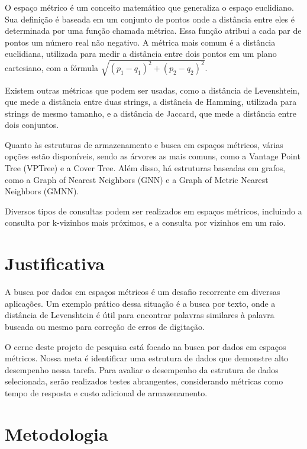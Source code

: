 \documentclass[a4paper,12pt,oneside]{article}
\begin{document}
O espaço métrico é um conceito matemático que generaliza o espaço euclidiano. Sua definição é baseada em um conjunto de pontos onde a distância entre eles é determinada por uma função chamada métrica. Essa função atribui a cada par de pontos um número real não negativo. A métrica mais comum é a distância euclidiana, utilizada para medir a distância entre dois pontos em um plano cartesiano, com a fórmula $\sqrt{(p_1-q_1)^2 + (p_2-q_2)^2}$.

Existem outras métricas que podem ser usadas, como a distância de Levenshtein, que mede a distância entre duas strings, a distância de Hamming, utilizada para strings de mesmo tamanho, e a distância de Jaccard, que mede a distância entre dois conjuntos.

Quanto às estruturas de armazenamento e busca em espaços métricos, várias opções estão disponíveis, sendo as árvores as mais comuns, como a Vantage Point Tree (VPTree) e a Cover Tree. Além disso, há estruturas baseadas em grafos, como a Graph of Nearest Neighbors (GNN) e a Graph of Metric Nearest Neighbors (GMNN).

Diversos tipos de consultas podem ser realizados em espaços métricos, incluindo a consulta por k-vizinhos mais próximos, e a consulta por vizinhos em um raio.


\section{Justificativa}

A busca por dados em espaços métricos é um desafio recorrente em diversas aplicações. Um exemplo prático dessa situação é a busca por texto, onde a distância de Levenshtein é útil para encontrar palavras similares à palavra buscada ou mesmo para correção de erros de digitação.

O cerne deste projeto de pesquisa está focado na busca por dados em espaços métricos. Nossa meta é identificar uma estrutura de dados que demonstre alto desempenho nessa tarefa. Para avaliar o desempenho da estrutura de dados selecionada, serão realizados testes abrangentes, considerando métricas como tempo de resposta e custo adicional de armazenamento.


\section{Metodologia}
\label{sec:metodologia}
\end{document}
